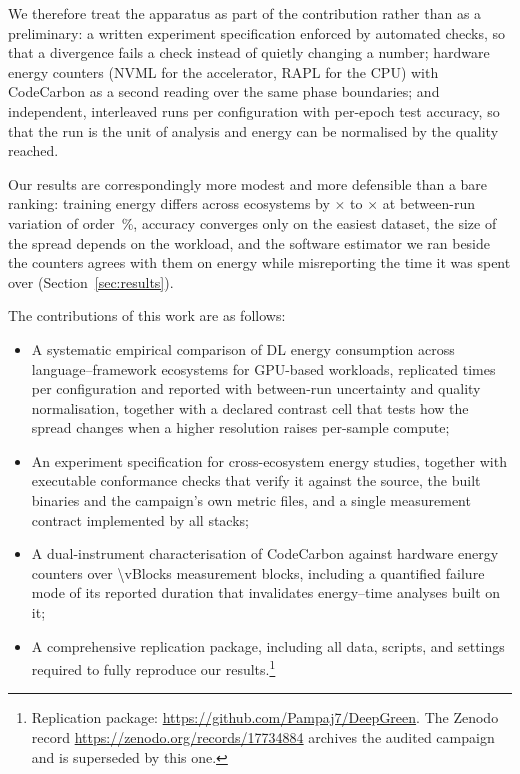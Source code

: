We therefore treat the apparatus as part of the contribution rather than as a preliminary: a written experiment specification enforced by \vConformanceChecks{} automated checks, so that a divergence fails a check instead of quietly changing a number; hardware energy counters (NVML for the accelerator, RAPL for the CPU) with CodeCarbon as a second reading over the same phase boundaries; and \vRepetitions{} independent, interleaved runs per configuration with per-epoch test accuracy, so that the run is the unit of analysis and energy can be normalised by the quality reached.

Our results are correspondingly more modest and more defensible than a bare ranking: training energy differs across ecosystems by \vSpreadTrainMin$\times$ to \vSpreadTrainMax$\times$ at between-run variation of order \vCVTrainMedian\,\%, accuracy converges only on the easiest dataset, the size of the spread depends on the workload, and the software estimator we ran beside the counters agrees with them on energy while misreporting the time it was spent over (Section~\ref{sec:results}).

The contributions of this work are as follows:
\begin{itemize}
    \item A systematic empirical comparison of DL energy consumption across \vEcosystems{} language--framework ecosystems for GPU-based workloads, replicated \vRepetitions{} times per configuration and reported with between-run uncertainty and quality normalisation, together with a declared contrast cell that tests how the spread changes when a higher resolution raises per-sample compute;
    \item An experiment specification for cross-ecosystem energy studies, together with \vConformanceChecks{} executable conformance checks that verify it against the source, the built binaries and the campaign's own metric files, and a single measurement contract implemented by all \vEcosystems{} stacks;
    \item A dual-instrument characterisation of CodeCarbon against hardware energy counters over \num{\vBlocks} measurement blocks, including a quantified failure mode of its reported duration that invalidates energy--time analyses built on it;
    \item A comprehensive replication package, including all data, scripts, and settings required to fully reproduce our results.\footnote{Replication package: \url{https://github.com/Pampaj7/DeepGreen}. The
Zenodo record \url{https://zenodo.org/records/17734884} archives the audited
campaign and is superseded by this one.}
\end{itemize}

